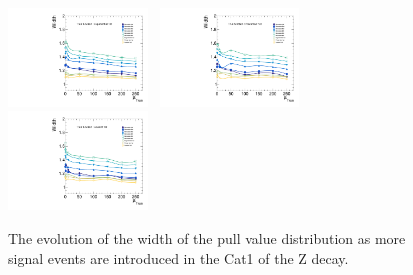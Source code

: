 \begin{figure}[!ht]
  \includegraphics[width=0.33\textwidth]{Fig/BiasStudy/Linearity/ZJpsiG_Cat1/pull_width_linearity_TrueFunc6}~
  \includegraphics[width=0.33\textwidth]{Fig/BiasStudy/Linearity/ZJpsiG_Cat1/pull_width_linearity_TrueFunc7}~
  \includegraphics[width=0.33\textwidth]{Fig/BiasStudy/Linearity/ZJpsiG_Cat1/pull_width_linearity_TrueFunc8}\\
  \caption{The evolution of the width of the pull value distribution as more signal events are introduced in the Cat1 of the Z decay.}
  \label{fig:Linearity_width_ZJpsiG_Cat1}
\end{figure}
\clearpage
%
%
